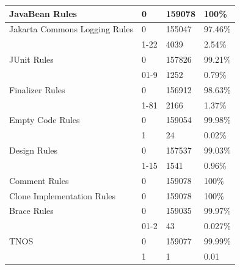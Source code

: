 \begin{table}[H]
{{\begin{tabular}{llll}
JavaBean Rules                      & 0                & 159078            & 100\%          \\
\hline
Jakarta Commons Logging   Rules     & 0                & 155047            & 97.46\%        \\
                                    & 1-22           & 4039              & 2.54\%         \\
                                    \hline
JUnit Rules                         & 0                & 157826            & 99.21\%        \\
                                    & 01-9          & 1252              & 0.79\%         \\
                                    \hline
Finalizer Rules                     & 0                & 156912            & 98.63\%        \\
                                    & 1-81           & 2166              & 1.37\%         \\
                                    \hline
Empty Code Rules                    & 0                & 159054            & 99.98\%        \\
                                    & 1                & 24                & 0.02\%         \\
                                    \hline
Design Rules                        & 0                & 157537            & 99.03\%        \\
                                    & 1-15           & 1541              & 0.96\%         \\
                                    \hline
Comment Rules                       & 0                & 159078            & 100\%          \\
\hline
Clone Implementation Rules          & 0                & 159078            & 100\%          \\
\hline
Brace Rules                         & 0                & 159035            & 99.97\%        \\
\hline
                                    & 01-2           & 43                & 0.027\%        \\
                                    \hline
TNOS                                & 0                & 159077            & 99.99\%        \\
\hline
                                    & 1                & 1                 & 0.01          
\\\bottomrule
\end{tabular}
}
\captionsetup{labelsep=period, labelfont=bf}



}

\end{table}